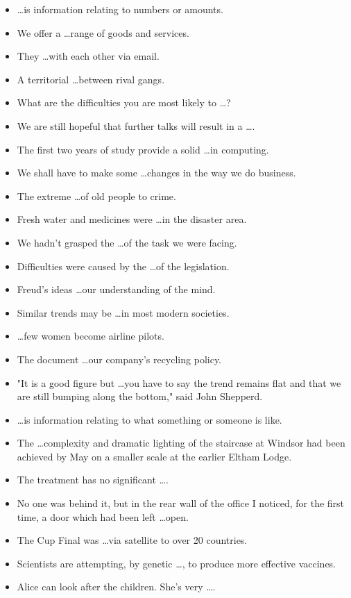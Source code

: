 \documentclass[a4paper,10pt]{article}
\theoremstyle{discussion_style} \newtheorem{discussion}{\color{red}{Discussion point}}
\theoremstyle{theorem_style} \newtheorem{theorem}{Theorem}
\begin{document}
\begin{itemize}
\item \ldots is information relating to numbers or amounts.
\item We offer a \ldots range of goods and services.
\item They \ldots with each other via email.
\item A territorial \ldots between rival gangs.
\item What are the difficulties you are most likely to \ldots? 
\item We are still hopeful that further talks will result in a \ldots.
\item The first two years of study provide a solid \ldots in computing.
\item We shall have to make some \ldots changes in the way we do business.
\item The extreme \ldots of old people to crime.
\item Fresh water and medicines were \ldots in the disaster area.
\item We hadn't grasped the \ldots of the task we were facing.
\item Difficulties were caused by the \ldots of the legislation.
\item Freud's ideas \ldots our understanding of the mind.
\item Similar trends may be \ldots in most modern societies.
\item \ldots few women become airline pilots.
\item The document \ldots our company's recycling policy.
\item "It is a good figure but \ldots you have to say the trend remains flat and that we are still bumping along the bottom," said John Shepperd.
\item \ldots is information relating to what something or someone is like.
\item The \ldots complexity and dramatic lighting of the staircase at Windsor had been achieved by May on a smaller scale at the earlier Eltham Lodge.
\item The treatment has no significant \ldots.
\item No one was behind it, but in the rear wall of the office I noticed, for the first time, a door which had been left \ldots open.
\item The Cup Final was \ldots via satellite to over 20 countries.
\item Scientists are attempting, by genetic \ldots, to produce more effective vaccines.
\item Alice can look after the children. She's very \ldots.
\end{itemize}
\end{document}
